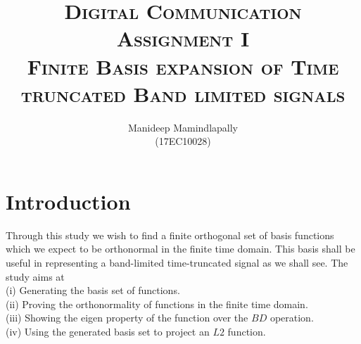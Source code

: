 \documentclass[a4paper,10pt]{article}
\begin{document}
%
   \title{{ 
   \textsc{Digital Communication} } \\
   \textsc{Assignment I} \\
   \Large{\textsc{Finite Basis expansion of Time truncated Band limited signals}}}

   \author{ 
   	Manideep Mamindlapally
   	\\ (17EC10028)}
          
   \date{}
   \maketitle
    
\section*{Introduction}
Through this study we wish to find a finite orthogonal set of basis functions which we expect to be orthonormal in the finite time domain. This basis shall be useful in representing a band-limited time-truncated signal as we shall see. The study aims at \\
(i) Generating the basis set of functions.\\
(ii) Proving the orthonormality of functions in the finite time domain.\\
(iii) Showing the eigen property of the function over the $BD$ operation. \\
(iv) Using the generated basis set to project an $L2$ function. \\
 
\end{document}
